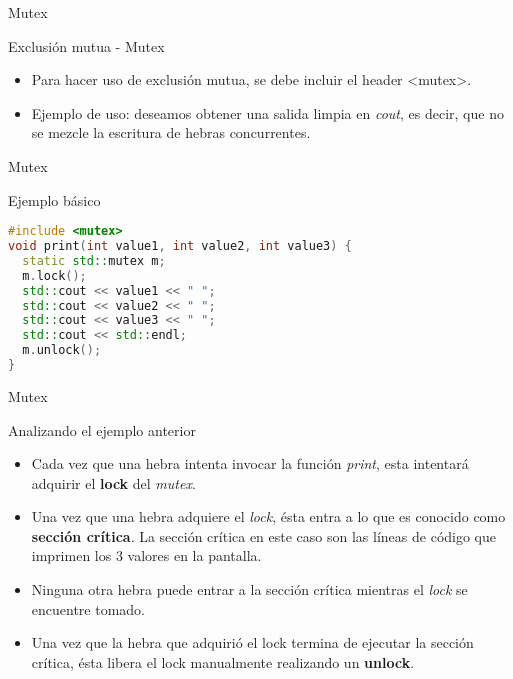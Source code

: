 \begin{frame}{Mutex}
\begin{block}{Exclusión mutua - Mutex}
\begin{itemize}
  \item Para hacer uso de exclusión mutua, se debe incluir el header \textless mutex\textgreater .
  \item Ejemplo de uso: deseamos obtener una salida limpia en \textit{cout}, es decir, que no se mezcle la escritura de hebras concurrentes.
\end{itemize}
\end{block}
\end{frame}

\begin{frame}[fragile]{Mutex}
\begin{block}{Ejemplo básico}
\begin{lstlisting}[language=C++, basicstyle=\small]
#include <mutex>
void print(int value1, int value2, int value3) {
  static std::mutex m;
  m.lock();
  std::cout << value1 << " ";
  std::cout << value2 << " ";
  std::cout << value3 << " ";
  std::cout << std::endl;
  m.unlock();
}
\end{lstlisting}
\end{block}
\end{frame}

\begin{frame}{Mutex}
\begin{block}{Analizando el ejemplo anterior}
\begin{itemize}
  \item Cada vez que una hebra intenta invocar la función \textit{print}, esta intentará adquirir el \textbf{lock} del \textit{mutex}.
  \item Una vez que una hebra adquiere el \textit{lock}, ésta entra a lo que es conocido como \textbf{sección crítica}. La sección crítica en este caso son las líneas de código que imprimen los 3 valores en la pantalla.
  \item Ninguna otra hebra puede entrar a la sección crítica mientras el \textit{lock} se encuentre tomado.
  \item Una vez que la hebra que adquirió el lock termina de ejecutar la sección crítica, ésta libera el lock manualmente realizando un \textbf{unlock}.
\end{itemize}
\end{block}
\end{frame}

